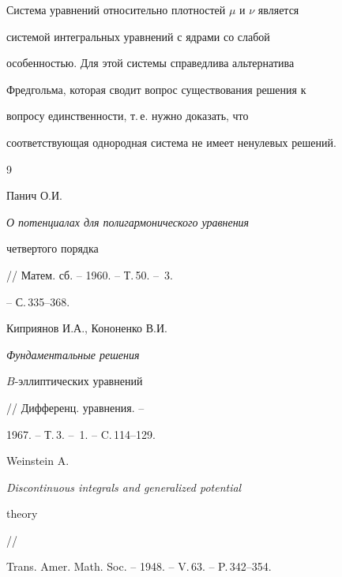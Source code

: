 Система уравнений относительно плотностей $\mu$ и $\nu$ является 


системой интегральных уравнений с ядрами со слабой 


особенностью. Для этой системы справедлива альтернатива 


Фредгольма, которая сводит вопрос существования решения к 


вопросу единственности, т.\,е. нужно доказать, что 


соответствующая однородная система не имеет ненулевых решений. 


 


\begin{thebibliography}{9} 


 




Панич О.И. {\em О потенциалах для полигармонического уравнения 


четвертого порядка} // Матем. сб. -- 1960. -- Т.\,50. -- \No\,3. 


-- С.\,335--368. 




Киприянов И.А., Кононенко В.И. {\em Фундаментальные решения 


$B$-эллиптических уравнений} // Дифференц. уравнения. -- 


1967. -- Т.\,3. -- \No\,1. -- C.\,114--129. 




Weinstein A. {\em Discontinuous integrals and generalized potential 


theory} //


Trans. Amer. Math. Soc. -- 1948. -- V.\,63. -- P.\,342--354. 


 


\end{thebibliography} 


 


\vskip 2cm 


 






 


\label{end} 


 



